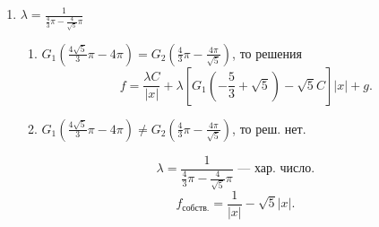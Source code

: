 \documentclass[a4paper]{article}
\begin{document}
\begin{enumerate}
\begin{enumerate}
\[G_1\left(-\frac{5}{3}-\sqrt{5} \right)+\sqrt{5} C\right] |x|+g
.\] 
\item $
		G_1\left( - \frac{4\sqrt{5} }{3}\pi- 4 \pi \right) 	\neq G_2 \left( \frac{4}{3} \pi + \frac{4 \pi}{\sqrt{5} } \right)
	$, решения нет.
\end{enumerate}
\[
\lambda= \frac{1}{\frac{4}{3}\pi+ \frac{4}{\sqrt{5} }\pi} \text{ ---
 хар. число}
.\] 
\[
f_\text{собств.}= \frac{1}{|x|}+\sqrt{5} |x|
.\] 
\item $\lambda = \frac{1}{\frac{4}{3}\pi- \frac{4}{\sqrt{5} }\pi}$ 
\begin{enumerate}
	\item $G_1\left( \frac{4 \sqrt{5} }{3}\pi - 4\pi \right) =
		G_2 \left( \frac{4}{3}\pi - \frac{4 \pi}{\sqrt{5} } \right) $, то решения
\[
	f= \frac{\lambda C}{|x|}+ \lambda \left[ G_1 \left(-\frac{5}{3}+\sqrt{5} \right)- \sqrt{5} C \right] |x|+g
.\] 
\item $G_1\left( \frac{4 \sqrt{5} }{3}\pi - 4\pi \right) \neq
		G_2 \left( \frac{4}{3}\pi - \frac{4 \pi}{\sqrt{5} } \right) $, то реш. нет.
\end{enumerate}
\[
\lambda= \frac{1}{\frac{4}{3}\pi- \frac{4}{\sqrt{5} }\pi} \text{ ---
 хар. число}
.\] 
\[
f_\text{собств.}= \frac{1}{|x|}-\sqrt{5} |x|
.\]
\end{enumerate}
\end{document}
